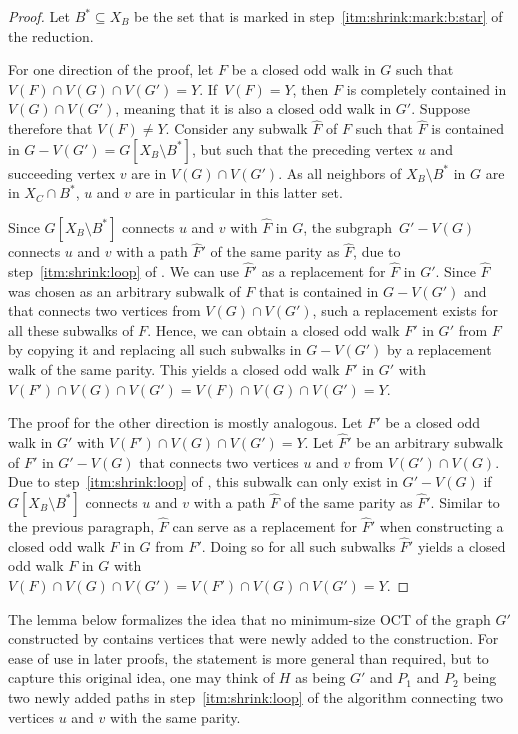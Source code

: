 \begin{proof}
	Let $B^\ast \subseteq X_B$ be the set that is marked in step~\ref{itm:shrink:mark:b:star} of the reduction.
	
	For one direction of the proof, let $F$ be a closed odd walk in $G$ such that $V(F) \cap V(G) \cap V(G') = Y$. If~$V(F) = Y$, then $F$ is completely contained in $V(G) \cap V(G')$, meaning that it is also a closed odd walk in $G'$. Suppose therefore that $V(F) \neq Y$. Consider any subwalk $\widehat{F}$ of $F$ such that $\widehat{F}$ is contained in $G - V(G') = G[X_B \setminus B^\ast]$, but such that the preceding vertex $u$ and succeeding vertex $v$ are in $V(G) \cap V(G')$. As all neighbors of $X_B \setminus B^\ast$ in $G$ are in $X_C \cap B^\ast$, $u$ and $v$ are in particular in this latter set.
	
	Since $G[X_B \setminus B^\ast]$ connects $u$ and $v$ with $\widehat{F}$ in $G$, the subgraph~$G' - V(G)$ connects $u$ and $v$ with a path $\widehat{F}'$ of the same parity as $\widehat{F}$, due to step~\ref{itm:shrink:loop} of . We can use $\widehat{F}'$ as a replacement for $\widehat{F}$ in $G'$. Since $\widehat{F}$ was chosen as an arbitrary subwalk of $F$ that is contained in $G - V(G')$ and that connects two vertices from $V(G) \cap V(G')$, such a replacement exists for all these subwalks of $F$. Hence, we can obtain a closed odd walk $F'$ in $G'$ from $F$ by copying it and replacing all such subwalks in $G - V(G')$ by a replacement walk of the same parity. This yields a closed odd walk $F'$ in $G'$ with $V(F') \cap V(G) \cap V(G') = V(F) \cap V(G) \cap V(G') = Y$.
	
	The proof for the other direction is mostly analogous. Let $F'$ be a closed odd walk in $G'$ with $V(F') \cap V(G) \cap V(G') = Y$. Let $\widehat{F}'$ be an arbitrary subwalk of $F'$ in $G' - V(G)$ that connects two vertices $u$ and $v$ from $V(G') \cap V(G)$. Due to step~\ref{itm:shrink:loop} of , this subwalk can only exist in $G' - V(G)$ if $G[X_B \setminus B^\ast]$ connects $u$ and $v$ with a path $\widehat{F}$ of the same parity as $\widehat{F}'$. Similar to the previous paragraph, $\widehat{F}$ can serve as a replacement for $\widehat{F}'$ when constructing a closed odd walk $F$ in $G$ from $F'$. Doing so for all such subwalks $\widehat{F}'$ yields a closed odd walk $F$ in $G$ with $V(F) \cap V(G) \cap V(G') = V(F') \cap V(G) \cap V(G') = Y$.
\end{proof}

The lemma below formalizes the idea that no minimum-size OCT of the graph $G'$ constructed by  contains vertices that were newly added to the construction. For ease of use in later proofs, the statement is more general than required, but to capture this original idea, one may think of $H$ as being $G'$ and $P_1$ and $P_2$ being two newly added paths in step~\ref{itm:shrink:loop} of the algorithm connecting two vertices $u$ and $v$ with the same parity.


